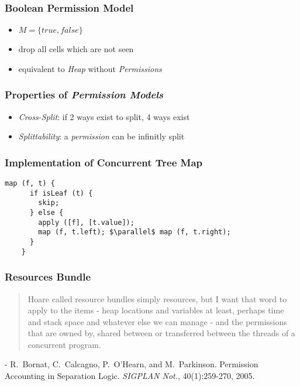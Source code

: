 \documentclass{beamer}
\begin{document}
	\begin{frame}[noframenumbering]
	\frametitle{Boolean Permission Model}
		\begin{itemize}
			\item $M = \{\textit{true}, \textit{false}\}$
			\item drop all cells which are not seen
			\item equivalent to \emph{Heap} without \emph{Permissions}
		\end{itemize}
	\end{frame}

	\begin{frame}[noframenumbering]
	\frametitle{Properties of \emph{Permission Models}}
		\begin{itemize}
			\item \emph{Cross-Split}: if 2 ways exist to split, 4 ways exist
			\item \emph{Splittability}: a \emph{permission} can be infinitly split
		\end{itemize}
	\end{frame}

	\begin{frame}
	\frametitle{Implementation of Concurrent Tree Map}
	\begin{lstlisting}[mathescape]
	map (f, t) {
	  if isLeaf (t) {
	    skip;
	  } else {
	    apply ([f], [t.value]);
	    map (f, t.left); $\parallel$ map (f, t.right);
	  }
	}
	\end{lstlisting}
	\end{frame}

	\begin{frame}[noframenumbering]
	\frametitle{Resources Bundle}
	\begin{quote}
		Hoare called resource bundles simply resources, but I
		want that word to apply to the items - heap locations
		and variables at least, perhaps time and stack space
		and whatever else we can manage - and the permissions
		that are owned by, shared between or transferred between
		the threads of a concurrent program.
	\end{quote}
	- R.~Bornat, C.~Calcagno, P.~O'Hearn, and M.~Parkinson. Permission Accounting
	in Separation Logic. \textit{SIGPLAN Not.}, 40(1):259-270, 2005.
	\end{frame}
\end{document}
